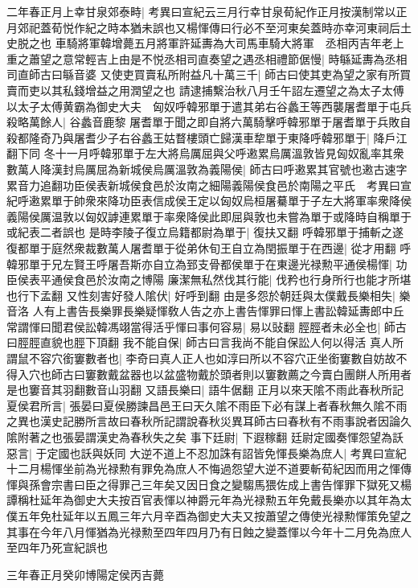 二年春正月上幸甘泉郊泰畤|{
	考異曰宣紀云三月行幸甘泉荀紀作正月按漢制常以正月郊祀蓋荀悦作紀之時本猶未誤也又楊惲傳曰行必不至河東矣蓋時亦幸河東祠后土史脱之也}
車騎將軍韓增薨五月將軍許延夀為大司馬車騎大將軍　丞相丙吉年老上重之蕭望之意常輕吉上由是不悦丞相司直奏望之遇丞相禮節倨慢|{
	時緐延夀為丞相司直師古曰緐音婆}
又使吏買賣私所附益凡十萬三千|{
	師古曰使其吏為望之家有所買賣而吏以其私錢增益之用潤望之也}
請逮捕繫治秋八月壬午詔左遷望之為太子太傅以太子太傅黄霸為御史大夫　匈奴呼韓邪單于遣其弟右谷蠡王等西襲屠耆單于屯兵殺略萬餘人|{
	谷蠡音鹿黎}
屠耆單于聞之即自將六萬騎擊呼韓邪單于屠耆單于兵敗自殺都隆奇乃與屠耆少子右谷蠡王姑瞀樓頭亡歸漢車犂單于東降呼韓邪單于|{
	降戶江翻下同}
冬十一月呼韓邪單于左大將烏厲屈與父呼遫累烏厲溫敦皆見匈奴亂率其衆數萬人降漢封烏厲屈為新城侯烏厲溫敦為義陽侯|{
	師古曰呼遫累其官號也遫古速字累音力追翻功臣侯表新城侯食邑於汝南之細陽義陽侯食邑於南陽之平氏　考異曰宣紀呼遫累單于帥衆來降功臣表信成侯王定以匈奴烏桓屠驀單于子左大將軍率衆降侯義陽侯厲温敦以匈奴謼連累單于率衆降侯此即屈與敦也未嘗為單于或降時自稱單于或紀表二者誤也}
是時李陵子復立烏籍都尉為單于|{
	復扶又翻}
呼韓邪單于捕斬之遂復都單于庭然衆裁數萬人屠耆單于從弟休旬王自立為閏振單于在西邊|{
	從才用翻}
呼韓邪單于兄左賢王呼屠吾斯亦自立為郅支骨都侯單于在東邊光禄勲平通侯楊惲|{
	功臣侯表平通侯食邑於汝南之博陽}
廉潔無私然伐其行能|{
	伐矜也行身所行也能才所堪也行下孟翻}
又性刻害好發人隂伏|{
	好呼到翻}
由是多怨於朝廷與太僕戴長樂相失|{
	樂音洛}
人有上書告長樂罪長樂疑惲敎人告之亦上書告惲罪曰惲上書訟韓延夀郎中丘常謂惲曰聞君侯訟韓馮翊當得活乎惲曰事何容易|{
	易以䜴翻}
脛脛者未必全也|{
	師古曰脛脛直貌也脛下頂翻}
我不能自保|{
	師古曰言我尚不能自保訟人何以得活}
真人所謂鼠不容穴銜窶數者也|{
	李奇曰真人正人也如淳曰所以不容穴正坐銜窶數自妨故不得入穴也師古曰窶數戴盆器也以盆盛物戴於頭者則以窶數薦之今賣白團餅人所用者是也窶音其羽翻數音山羽翻}
又語長樂曰|{
	語牛倨翻}
正月以來天隂不雨此春秋所記夏侯君所言|{
	張晏曰夏侯勝諫昌邑王曰天久隂不雨臣下必有謀上者春秋無久隂不雨之異也漢史記勝所言故曰春秋所記謂說春秋災異耳師古曰春秋有不雨事說者因論久隂附著之也張晏謂漢史為春秋失之矣}
事下廷尉|{
	下遐稼翻}
廷尉定國奏惲怨望為訞惡言|{
	于定國也訞與妖同}
大逆不道上不忍加誅有詔皆免惲長樂為庶人|{
	考異曰宣紀十二月楊惲坐前為光禄勲有罪免為庶人不悔過怨望大逆不道要斬荀紀因而用之惲傳惲與孫會宗書曰臣之得罪己三年矣又因日食之變騶馬猥佐成上書告惲罪下獄死又楊譚稱杜延年為御史大夫按百官表惲以神爵元年為光禄勲五年免戴長樂亦以其年為太僕五年免杜延年以五鳳三年六月辛酉為御史大夫又按蕭望之傳使光禄勲惲策免望之其事在今年八月惲猶為光禄勲至四年四月乃有日蝕之變蓋惲以今年十二月免為庶人至四年乃死宣紀誤也}


三年春正月癸卯博陽定侯丙吉薨

